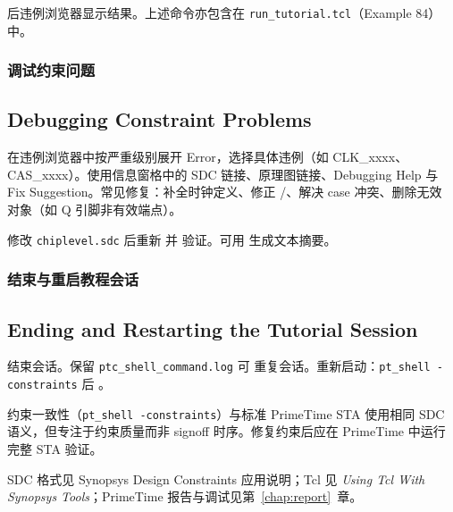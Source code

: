  后违例浏览器显示结果。上述命令亦包含在 \texttt{run\_tutorial.tcl}（Example 84）中。

\subsubsection{调试约束问题}
\subsection*{Debugging Constraint Problems}

在违例浏览器中按严重级别展开 Error，选择具体违例（如 CLK\_xxxx、CAS\_xxxx）。使用信息窗格中的 SDC 链接、原理图链接、Debugging Help 与 Fix Suggestion。常见修复：补全时钟定义、修正 /、解决 case 冲突、删除无效  对象（如 Q 引脚非有效端点）。

修改 \texttt{chiplevel.sdc} 后重新  并  验证。可用  生成文本摘要。

\subsubsection{结束与重启教程会话}
\subsection*{Ending and Restarting the Tutorial Session}

 结束会话。保留 \texttt{ptc\_shell\_command.log} 可  重复会话。重新启动：\texttt{pt\_shell -constraints} 后 。

\begin{noteBox}
约束一致性（\texttt{pt\_shell -constraints}）与标准 PrimeTime STA 使用相同 SDC 语义，但专注于约束质量而非 signoff 时序。修复约束后应在 PrimeTime 中运行完整 STA 验证。
\end{noteBox}

\begin{seeAlsoBox}
SDC 格式见 Synopsys Design Constraints 应用说明；Tcl 见 \textit{Using Tcl With Synopsys Tools}；PrimeTime 报告与调试见第~\ref{chap:report}~章。
\end{seeAlsoBox}

